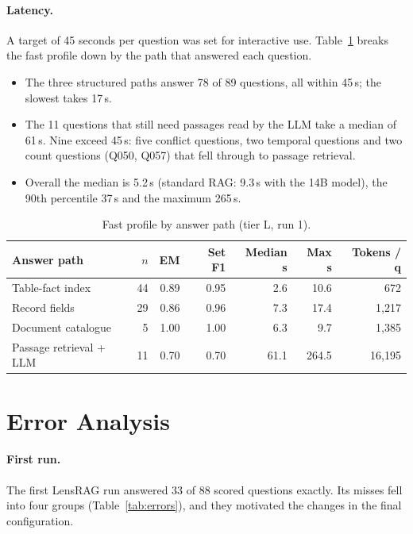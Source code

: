 \documentclass[11pt,letterpaper,oneside]{report}
\begin{document}
\paragraph{Latency.}
A target of 45 seconds per question was set for interactive use.
Table~\ref{tab:paths} breaks the fast profile down by the path that answered
each question.
\begin{itemize}
  \item The three structured paths answer 78 of 89 questions, all within
  45\,s; the slowest takes 17\,s.
  \item The 11 questions that still need passages read by the LLM take a
  median of 61\,s. Nine exceed 45\,s: five conflict questions, two temporal
  questions and two count questions (Q050, Q057) that fell through to
  passage retrieval.
  \item Overall the median is 5.2\,s (standard RAG: 9.3\,s with the 14B
  model), the 90th percentile 37\,s and the maximum 265\,s.
\end{itemize}

\begin{table}[htbp]
\centering\small
\caption{Fast profile by answer path (tier L, run 1).}
\label{tab:paths}
\begin{tabular}{@{}lrrrrrr@{}}
\toprule
Answer path & $n$ & EM & Set F1 & Median s & Max s & Tokens / q \\
\midrule
Table-fact index & 44 & 0.89 & 0.95 & 2.6 & 10.6 & 672 \\
Record fields & 29 & 0.86 & 0.96 & 7.3 & 17.4 & 1{,}217 \\
Document catalogue & 5 & 1.00 & 1.00 & 6.3 & 9.7 & 1{,}385 \\
Passage retrieval + LLM & 11 & 0.70 & 0.70 & 61.1 & 264.5 & 16{,}195 \\
\bottomrule
\end{tabular}
\end{table}

\section{Error Analysis}
\label{sec:errors}

\paragraph{First run.}
The first LensRAG run answered 33 of 88 scored questions exactly. Its misses
fell into four groups (Table~\ref{tab:errors}), and they motivated the
changes in the final configuration.
\end{document}
